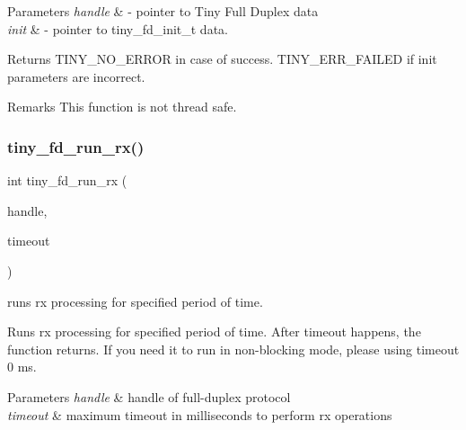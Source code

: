 \begin{DoxyParams}{Parameters}
{\em handle} & -\/ pointer to Tiny Full Duplex data \\
\hline
{\em init} & -\/ pointer to tiny\+\_\+fd\+\_\+init\+\_\+t data. \\
\hline
\end{DoxyParams}
\begin{DoxyReturn}{Returns}
T\+I\+N\+Y\+\_\+\+N\+O\+\_\+\+E\+R\+R\+OR in case of success. T\+I\+N\+Y\+\_\+\+E\+R\+R\+\_\+\+F\+A\+I\+L\+ED if init parameters are incorrect. 
\end{DoxyReturn}
\begin{DoxyRemark}{Remarks}
This function is not thread safe. 
\end{DoxyRemark}
\mbox{\label{group__FULL__DUPLEX__API_gad31f944514aef01e27bc3ec67fdbe140}} 
\subsubsection{\texorpdfstring{tiny\+\_\+fd\+\_\+run\+\_\+rx()}{tiny\_fd\_run\_rx()}}
{\footnotesize\ttfamily int tiny\+\_\+fd\+\_\+run\+\_\+rx (\begin{DoxyParamCaption}\item[{\hyperlink{group__FULL__DUPLEX__API_ga91e6b79431fe38570fb102701ef0b7e8}{tiny\+\_\+fd\+\_\+handle\+\_\+t}}]{handle,  }\item[{uint16\+\_\+t}]{timeout }\end{DoxyParamCaption})}



runs rx processing for specified period of time. 

Runs rx processing for specified period of time. After timeout happens, the function returns. If you need it to run in non-\/blocking mode, please using timeout 0 ms.


\begin{DoxyParams}{Parameters}
{\em handle} & handle of full-\/duplex protocol \\
\hline
{\em timeout} & maximum timeout in milliseconds to perform rx operations \\
\hline
\end{DoxyParams}
\mbox{\label{group__FULL__DUPLEX__API_ga601c9874a570331580856c1ea28f7914}} 
